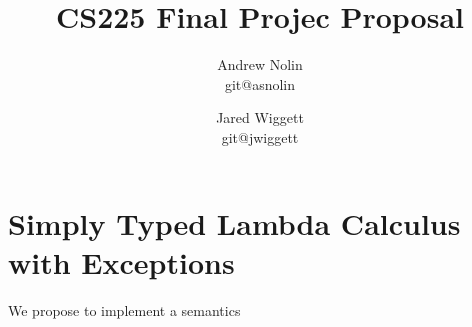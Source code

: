 \documentclass{article}
\title{CS225 Final Projec Proposal}
\author{Andrew Nolin \\ git@asnolin \and Jared Wiggett \\ git@jwiggett}
\begin{document}
\maketitle
\section*{Simply Typed Lambda Calculus with Exceptions}
We propose to implement a semantics 
\end{document}

